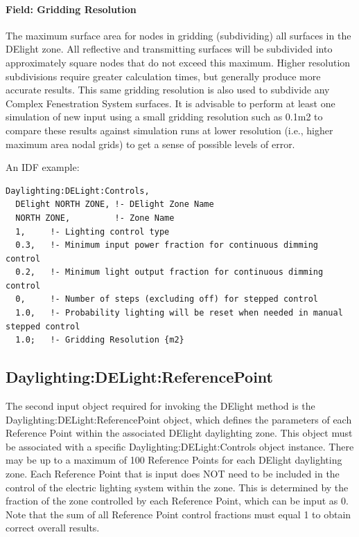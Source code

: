 \paragraph{Field: Gridding Resolution}\label{field-gridding-resolution}

The maximum surface area for nodes in gridding (subdividing) all surfaces in the DElight zone. All reflective and transmitting surfaces will be subdivided into approximately square nodes that do not exceed this maximum. Higher resolution subdivisions require greater calculation times, but generally produce more accurate results. This same gridding resolution is also used to subdivide any Complex Fenestration System surfaces. It is advisable to perform at least one simulation of new input using a small gridding resolution such as 0.1m2 to compare these results against simulation runs at lower resolution (i.e., higher maximum area nodal grids) to get a sense of possible levels of error.

An IDF example:

\begin{lstlisting}
Daylighting:DELight:Controls,
  DElight NORTH ZONE, !- DElight Zone Name
  NORTH ZONE,         !- Zone Name
  1,     !- Lighting control type
  0.3,   !- Minimum input power fraction for continuous dimming control
  0.2,   !- Minimum light output fraction for continuous dimming control
  0,     !- Number of steps (excluding off) for stepped control
  1.0,   !- Probability lighting will be reset when needed in manual stepped control
  1.0;   !- Gridding Resolution {m2}
\end{lstlisting}

\subsection{Daylighting:DELight:ReferencePoint}\label{daylightingdelightreferencepoint}

The second input object required for invoking the DElight method is the Daylighting:DELight:ReferencePoint object, which defines the parameters of each Reference Point within the associated DElight daylighting zone. This object must be associated with a specific Daylighting:DELight:Controls object instance. There may be up to a maximum of 100 Reference Points for each DElight daylighting zone. Each Reference Point that is input does NOT need to be included in the control of the electric lighting system within the zone. This is determined by the fraction of the zone controlled by each Reference Point, which can be input as 0. Note that the sum of all Reference Point control fractions must equal 1 to obtain correct overall results.

